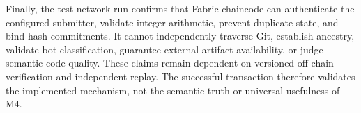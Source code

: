 Finally, the test-network run confirms that Fabric chaincode can authenticate the configured submitter, validate integer
arithmetic, prevent duplicate state, and bind
hash commitments. It cannot independently traverse Git, establish ancestry, validate bot classification, guarantee
external artifact availability, or judge semantic code quality. These claims remain dependent on versioned off-chain
verification and independent replay. The successful transaction therefore validates the implemented mechanism, not the
semantic truth or universal usefulness of M4.
